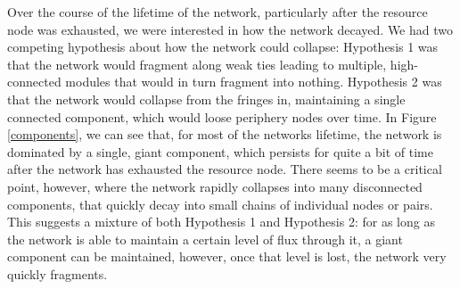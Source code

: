 \documentclass{paper}
\begin{document}
	Over the course of the lifetime of the network, particularly after the resource node was exhausted, we were interested in how the network decayed. We had two competing hypothesis about how the network could collapse: Hypothesis 1 was that the network would fragment along weak ties leading to multiple, high-connected modules that would in turn fragment into nothing. Hypothesis 2 was that the network would collapse from the fringes in, maintaining a single connected component, which would loose periphery nodes over time. In Figure \ref{components}, we can see that, for most of the networks lifetime, the network is dominated by a single, giant component, which persists for quite a bit of time after the network has exhausted the resource node. There seems to be a critical point, however, where the network rapidly collapses into many disconnected components, that quickly decay into small chains of individual nodes or pairs. This suggests a mixture of both Hypothesis 1 and Hypothesis 2: for as long as the network is able to maintain a certain level of flux through it, a giant component can be maintained, however, once that level is lost, the network very quickly fragments. 
	
\end{document}
